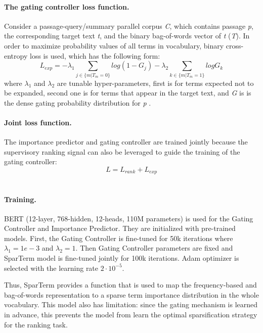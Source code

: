\documentclass[
    twocolumn,
]{ceurart}
\begin{document}
    \paragraph{The gating controller loss function.}
    Consider a passage-query/summary parallel corpus \emph{C}, which contains passage \emph{p}, the
    corresponding target text \emph{t}, and the binary bag-of-words vector of \emph{t} (\emph{T}).
    In order to maximize probability values of all terms in vocabulary, binary cross-entropy loss
    is used, which has the following form:
    \begin{equation}
        L_{exp}=-\lambda_1\sum_{j \in \{m|T_m=0\}}log(1-G_j)-\lambda_2\sum_{k \in \{m|T_m=1\}}logG_k
    \end{equation}
    where $\lambda_1$ and $\lambda_2$ are tunable hyper-parameters, first is for terms expected not to be
    expanded, second one is for terms that appear in the target text, and \emph{G} is is the dense
    gating probability distribution for \emph{p} \cite{SparTerm}.

    \paragraph{Joint loss function.}
    The importance predictor and gating controller are trained jointly because the supervisory
    ranking signal can also be leveraged to guide the training of the gating controller:
    \begin{equation}
        L = L_{rank} + L_{exp}
    \end{equation}\\

    \paragraph{Training.}
    BERT (12-layer, 768-hidden, 12-heads, 110M parameters) is used for the Gating Controller
    and Importance Predictor.
    They are initialized with pre-trained models.
    First, the Gating Controller is fine-tuned for 50k iterations where
    $\lambda_1 = 1e - 3$ and $\lambda_2 = 1$.
    Then Gating Controller parameters are fixed and SparTerm model is fine-tuned jointly for 100k
    iterations.
    Adam optimizer is selected with the learning rate $2 \cdot 10^{-5}$.\\\par

    Thus, SparTerm provides a function that is used to map the frequency-based and bag-of-words
    representation to a sparse term importance distribution in the whole vocabulary.
    This model also has limitation: since the gating mechanism is learned in advance, this prevents
    the model from learn the optimal sparsification strategy for the ranking task.
\end{document}
